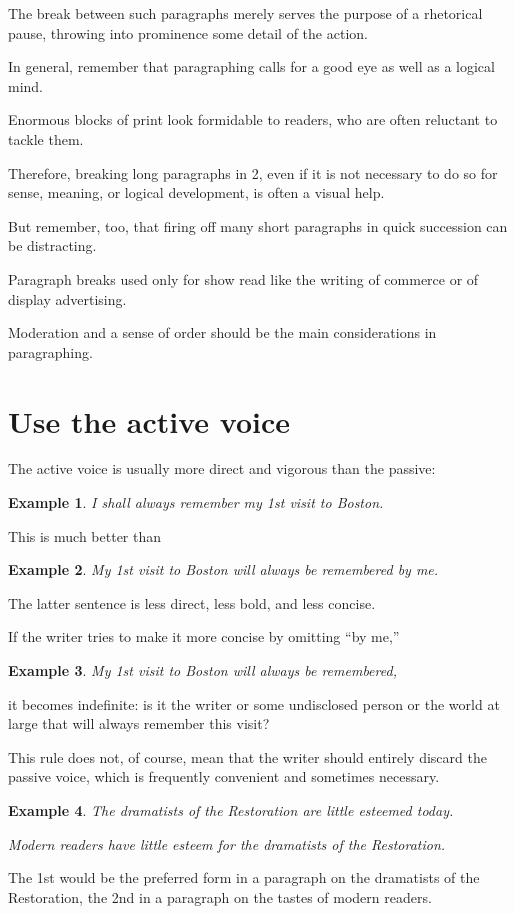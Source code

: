 \documentclass{book}
\numberwithin{equation}{section}
\newtheorem{example}{Example}[chapter]
\begin{document}
The break between such paragraphs merely serves the purpose of a rhetorical pause, throwing into prominence some detail of the action.

%
In general, remember that paragraphing calls for a good eye as well as a logical mind.

Enormous blocks of print look formidable to readers, who are often reluctant to tackle them.

Therefore, breaking long paragraphs in 2, even if it is not necessary to do so for sense, meaning, or logical development, is often a visual help.

But remember, too, that firing off many short paragraphs in quick succession can be distracting.

Paragraph breaks used only for show read like the writing of commerce or of display advertising.

Moderation and a sense of order should be the main considerations in paragraphing.

\section{Use the active voice}
The active voice is usually more direct and vigorous than the passive:
\begin{example}
    I shall always remember my 1st visit to Boston.
\end{example}
This is much better than
\begin{example}
    My 1st visit to Boston will always be remembered by me.
\end{example}
The latter sentence is less direct, less bold, and less concise.

If the writer tries to make it more concise by omitting ``by me,''
\begin{example}
    My 1st visit to Boston will always be remembered,
\end{example}
it becomes indefinite: is it the writer or some undisclosed person or the world at large that will always remember this visit?

%
This rule does not, of course, mean that the writer should entirely discard the passive voice, which is frequently convenient and sometimes necessary.
\begin{example}
    The dramatists of the Restoration are little esteemed today.
    
    Modern readers have little esteem for the dramatists of the Restoration.
\end{example}
The 1st would be the preferred form in a paragraph on the dramatists of the Restoration, the 2nd in a paragraph on the tastes of modern readers.
\end{document}
